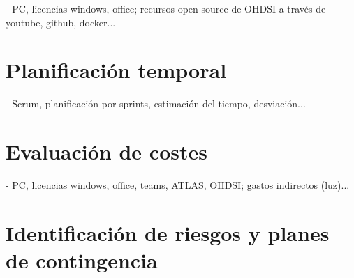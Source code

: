 - PC, licencias windows, office; recursos open-source de OHDSI a través de youtube, github, docker...

\section{Planificación temporal} \label{sec:03Temporal}

- Scrum, planificación por sprints, estimación del tiempo, desviación...

\section{Evaluación de costes} \label{sec:03Costes}

- PC, licencias windows, office, teams, ATLAS, OHDSI; gastos indirectos (luz)...

\section{Identificación de riesgos y planes de contingencia} \label{sec:03Riesgos}
